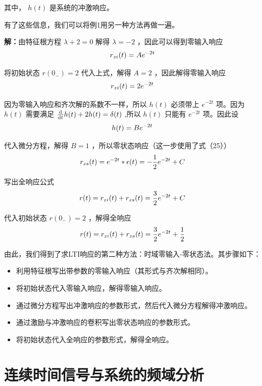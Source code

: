 \documentclass[UTF8,a4paper,11pt]{article}
\begin{document}
其中， $h(t)$ 是系统的冲激响应。

有了这些信息，我们可以将例1用另一种方法再做一遍。

\textbf{解：}由特征根方程 $\lambda +2=0$ 解得 $\lambda =-2$ ，因此可以得到零输入响应
\begin{equation}
r_{zi}(t)=Ae^{-2t}
\notag
\end{equation}

将初始状态 $r(0_{-})=2$ 代入上式，解得 $A=2$ ，因此解得零输入响应
\begin{equation}
r_{zi}(t)=2e^{-2t}
\notag
\end{equation}

因为零输入响应和齐次解的系数不一样，所以 $h(t)$ 必须带上 $e^{-2t}$ 项。因为 $h(t)$ 需要满足 $\frac{{\rm d}}{{\rm d}t}h(t)+2h(t)=\delta(t)$ ,所以 $h(t)$ 只能有 $e^{-2t}$ 项。因此设
\begin{equation}
h(t)=Be^{-2t}
\notag
\end{equation}

代入微分方程，解得 $B=1$ ，所以零状态响应（这一步使用了式（25））
\begin{equation}
r_{zs}(t)=e^{-2t}*\epsilon(t)=-\frac{1}{2}e^{-2t}+C
\notag
\end{equation}

写出全响应公式
\begin{equation}
r(t)=r_{zi}(t)+r_{zs}(t)=\frac{3}{2}e^{-2t}+C
\notag
\end{equation}

代入初始状态 $r(0_{-})=2$ ，解得全响应
\begin{equation}
r(t)=r_{zi}(t)+r_{zs}(t)=\frac{3}{2}e^{-2t}+\frac{1}{2}
\notag
\end{equation}

由此，我们得到了求LTI响应的第二种方法：时域零输入-零状态法。其步骤如下：
\begin{itemize}
\item 利用特征根写出带参数的零输入响应（其形式与齐次解相同）。
\item 将初始状态代入零输入响应，解得零输入响应。
\item 通过微分方程写出冲激响应的参数形式，然后代入微分方程解得冲激响应。
\item 通过激励与冲激响应的卷积写出零状态响应的参数形式。
\item 将初始状态代入全响应的参数形式，解得全响应。
\end{itemize} 

\section{连续时间信号与系统的频域分析}
\end{document}
